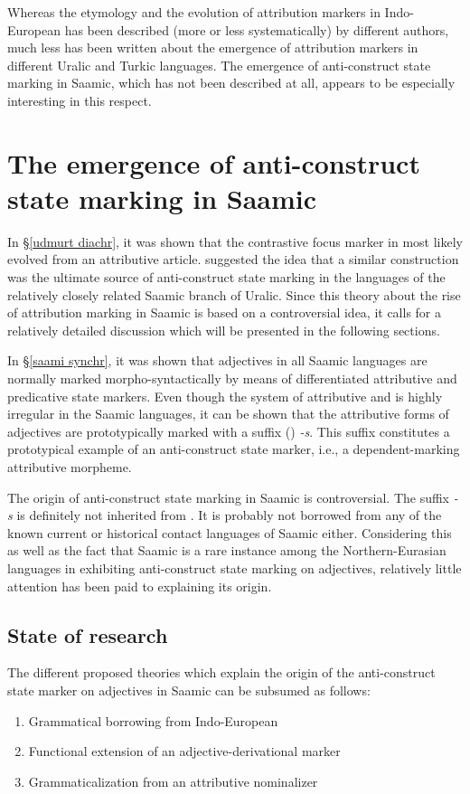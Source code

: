{Whereas the etymology and the evolution of attribution markers in Indo\hyp{}European has been described (more or less systematically) by different authors, much less has been written about the emergence of attribution markers in different Uralic and Turkic languages. The emergence of anti\hyp{}construct state marking in Saamic, which has not been described at all, appears to be especially interesting in this respect.

\section[Anti\hyp{}construct state in Saamic]{The emergence of anti\hyp{}construct state marking in Saamic}
\label{saamic diachr}
In \S\ref{udmurt diachr}, it was shown that the contrastive focus marker in  most likely evolved from an attributive article. \citet{riesler2006b} suggested the idea that a similar construction was the ultimate source of anti\hyp{}construct state marking in the languages of the relatively closely related Saamic branch of Uralic. Since this theory about the rise of attribution marking in Saamic is based on a controversial idea, it calls for a relatively detailed discussion which will be presented in the following sections.

In \S\ref{saami synchr}, it was shown that adjectives in all Saamic languages are normally marked morpho-syntactically by means of differentiated attributive and predicative state markers. Even though the system of attributive and  is highly irregular in the Saamic languages, it can be shown that the attributive forms of adjectives are prototypically marked with a suffix () \textit{-s}. This suffix constitutes a prototypical example of an anti\hyp{}construct state marker, i.e., a dependent\hyp{}marking attributive morpheme.

The origin of anti\hyp{}construct state marking in Saamic is controversial. The suffix \textit{-s} is definitely not inherited from . It is probably not borrowed from any of the known current or historical contact languages of Saamic either. Considering this as well as the fact that Saamic is a rare instance among the Northern-Eurasian languages in exhibiting anti\hyp{}construct state marking on adjectives, relatively little attention has been paid to explaining its origin.

\subsection{State of research}
The different proposed theories which explain the origin of the anti\hyp{}construct state marker on adjectives in Saamic can be subsumed as follows:
\begin{enumerate}
\item Grammatical borrowing from Indo-European
\item Functional extension of an adjective-derivational marker
\item Grammaticalization from an attributive nominalizer
\end{enumerate}

}
